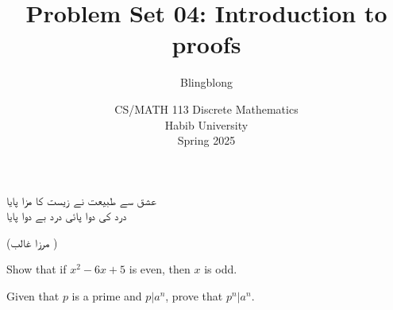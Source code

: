 \documentclass[a4paper]{exam}
\title{Problem Set 04: Introduction to proofs}
\author{Blingblong} %
\date{CS/MATH 113 Discrete Mathematics\\Habib University\\Spring 2025}
\begin{document}
\maketitle

\begin{center}
    \texturdu{عشق سے طبیعت نے زیست کا مزا پایا}
    \\\texturdu{درد کی دوا پائی درد بے دوا پایا}
    \begin{flushleft}
        \hspace*{4.5cm} (\texturdu{مرزا غالب })
    \end{flushleft}
\end{center}

\begin{questions}

    \question[5] Show that if $x^{2} - 6x + 5$ is even, then $x$ is odd.
    \begin{solution}
    \end{solution}

    \question[5] Given that $p$ is a prime and $p|a^n$, prove that $p^n|a^n$. 
    \begin{solution}
    \end{solution}


    
\end{questions}
\end{document}
